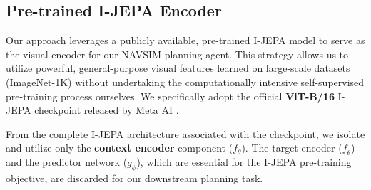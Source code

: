 \documentclass{article}
\begin{document}


\subsection{Pre-trained I-JEPA Encoder}
\label{subsec:encoder}
Our approach leverages a publicly available, pre-trained I-JEPA model to serve as the visual encoder for our NAVSIM planning agent. This strategy allows us to utilize powerful, general-purpose visual features learned on large-scale datasets (ImageNet-1K) without undertaking the computationally intensive self-supervised pre-training process ourselves. We specifically adopt the official \textbf{ViT-B/16} I-JEPA checkpoint released by Meta AI \cite{assran2023ijepa}.

From the complete I-JEPA architecture associated with the checkpoint, we isolate and utilize only the \textbf{context encoder} component ($f_\theta$). The target encoder ($f_{\bar{\theta}}$) and the predictor network ($g_\phi$), which are essential for the I-JEPA pre-training objective, are discarded for our downstream planning task.
\end{document}
